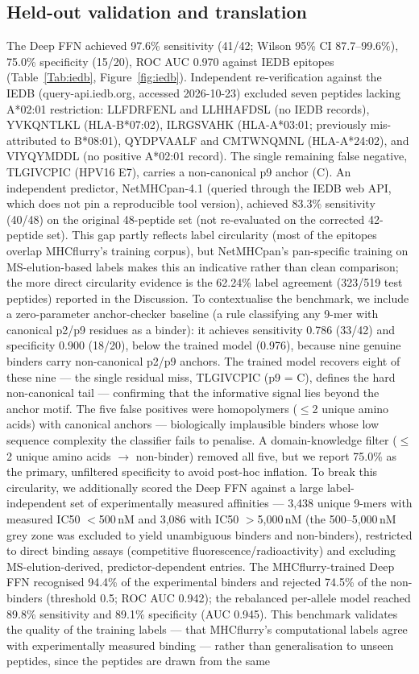 \subsection{Held-out validation and translation}
The Deep FFN achieved 97.6\% sensitivity (41/42; Wilson 95\% CI 87.7--99.6\%), 75.0\% specificity (15/20), ROC AUC 0.970 against IEDB epitopes (Table~\ref{Tab:iedb}, Figure~\ref{fig:iedb}). Independent re-verification against the IEDB (query-api.iedb.org, accessed 2026-10-23) excluded seven peptides lacking A*02:01 restriction: LLFDRFENL and LLHHAFDSL (no IEDB records), YVKQNTLKL (HLA-B*07:02), ILRGSVAHK (HLA-A*03:01; previously mis-attributed to B*08:01), QYDPVAALF and CMTWNQMNL (HLA-A*24:02), and VIYQYMDDL (no positive A*02:01 record). The single remaining false negative, TLGIVCPIC (HPV16 E7), carries a non-canonical p9 anchor (C). An independent predictor, NetMHCpan-4.1 (queried through the IEDB web API, which does not pin a reproducible tool version), achieved 83.3\% sensitivity (40/48) on the original 48-peptide set (not re-evaluated on the corrected 42-peptide set). This gap partly reflects label circularity (most of the epitopes overlap MHCflurry's training corpus), but NetMHCpan's pan-specific training on MS-elution-based labels makes this an indicative rather than clean comparison; the more direct circularity evidence is the 62.24\% label agreement (323/519 test peptides) reported in the Discussion. To contextualise the benchmark, we include a zero-parameter anchor-checker baseline (a rule classifying any 9-mer with canonical p2/p9 residues as a binder): it achieves sensitivity 0.786 (33/42) and specificity 0.900 (18/20), below the trained model (0.976), because nine genuine binders carry non-canonical p2/p9 anchors. The trained model recovers eight of these nine --- the single residual miss, TLGIVCPIC (p9 = C), defines the hard non-canonical tail --- confirming that the informative signal lies beyond the anchor motif. The five false positives were homopolymers ($\leq$2 unique amino acids) with canonical anchors --- biologically implausible binders whose low sequence complexity the classifier fails to penalise. A domain-knowledge filter ($\leq$2 unique amino acids $\rightarrow$ non-binder) removed all five, but we report 75.0\% as the primary, unfiltered specificity to avoid post-hoc inflation. To break this circularity, we additionally scored the Deep FFN against a large label-independent set of experimentally measured affinities --- 3,438 unique 9-mers with measured IC50 $<$500\,nM and 3,086 with IC50 $>$5,000\,nM (the 500--5,000\,nM grey zone was excluded to yield unambiguous binders and non-binders), restricted to direct binding assays (competitive fluorescence/radioactivity) and excluding MS-elution-derived, predictor-dependent entries. The MHCflurry-trained Deep FFN recognised 94.4\% of the experimental binders and rejected 74.5\% of the non-binders (threshold 0.5; ROC AUC 0.942); the rebalanced per-allele model reached 89.8\% sensitivity and 89.1\% specificity (AUC 0.945). This benchmark validates the quality of the training labels --- that MHCflurry's computational labels agree with experimentally measured binding --- rather than generalisation to unseen peptides, since the peptides are drawn from the same 